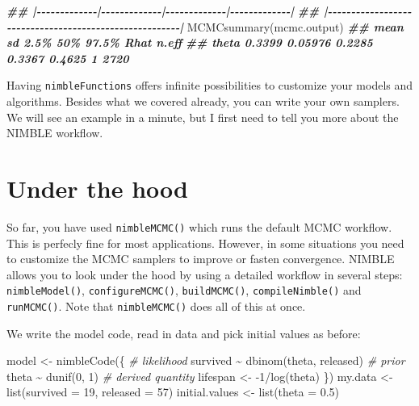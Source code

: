 \documentclass[
  12pt,
]{krantz}
\newenvironment{Shaded}{\begin{snugshade}}{\end{snugshade}}
\newcommand{\AttributeTok}[1]{\textcolor[rgb]{0.77,0.63,0.00}{#1}}
\newcommand{\CommentTok}[1]{\textcolor[rgb]{0.56,0.35,0.01}{\textit{#1}}}
\newcommand{\DecValTok}[1]{\textcolor[rgb]{0.00,0.00,0.81}{#1}}
\newcommand{\DocumentationTok}[1]{\textcolor[rgb]{0.56,0.35,0.01}{\textbf{\textit{#1}}}}
\newcommand{\FloatTok}[1]{\textcolor[rgb]{0.00,0.00,0.81}{#1}}
\newcommand{\FunctionTok}[1]{\textcolor[rgb]{0.00,0.00,0.00}{#1}}
\newcommand{\NormalTok}[1]{#1}
\newcommand{\OtherTok}[1]{\textcolor[rgb]{0.56,0.35,0.01}{#1}}
\newcommand{\SpecialCharTok}[1]{\textcolor[rgb]{0.00,0.00,0.00}{#1}}
\begin{document}
\begin{Shaded}
\begin{Highlighting}[]
\DocumentationTok{\#\# |{-}{-}{-}{-}{-}{-}{-}{-}{-}{-}{-}{-}{-}|{-}{-}{-}{-}{-}{-}{-}{-}{-}{-}{-}{-}{-}|{-}{-}{-}{-}{-}{-}{-}{-}{-}{-}{-}{-}{-}|{-}{-}{-}{-}{-}{-}{-}{-}{-}{-}{-}{-}{-}|}
\DocumentationTok{\#\# |{-}{-}{-}{-}{-}{-}{-}{-}{-}{-}{-}{-}{-}{-}{-}{-}{-}{-}{-}{-}{-}{-}{-}{-}{-}{-}{-}{-}{-}{-}{-}{-}{-}{-}{-}{-}{-}{-}{-}{-}{-}{-}{-}{-}{-}{-}{-}{-}{-}{-}{-}{-}{-}{-}{-}|}
\FunctionTok{MCMCsummary}\NormalTok{(mcmc.output)}
\DocumentationTok{\#\#         mean      sd   2.5\%    50\%  97.5\% Rhat n.eff}
\DocumentationTok{\#\# theta 0.3399 0.05976 0.2285 0.3367 0.4625    1  2720}
\end{Highlighting}
\end{Shaded}

Having \texttt{nimbleFunctions} offers infinite possibilities to customize your models and algorithms. Besides what we covered already, you can write your own samplers. We will see an example in a minute, but I first need to tell you more about the NIMBLE workflow.

\hypertarget{under-the-hood}{%
\section{Under the hood}\label{under-the-hood}}

So far, you have used \texttt{nimbleMCMC()} which runs the default MCMC workflow. This is perfecly fine for most applications. However, in some situations you need to customize the MCMC samplers to improve or fasten convergence. NIMBLE allows you to look under the hood by using a detailed workflow in several steps: \texttt{nimbleModel()}, \texttt{configureMCMC()}, \texttt{buildMCMC()}, \texttt{compileNimble()} and \texttt{runMCMC()}. Note that \texttt{nimbleMCMC()} does all of this at once.

We write the model code, read in data and pick initial values as before:

\begin{Shaded}
\begin{Highlighting}[]
\NormalTok{model }\OtherTok{\textless{}{-}} \FunctionTok{nimbleCode}\NormalTok{(\{}
  \CommentTok{\# likelihood}
\NormalTok{  survived }\SpecialCharTok{\textasciitilde{}} \FunctionTok{dbinom}\NormalTok{(theta, released)}
  \CommentTok{\# prior}
\NormalTok{  theta }\SpecialCharTok{\textasciitilde{}} \FunctionTok{dunif}\NormalTok{(}\DecValTok{0}\NormalTok{, }\DecValTok{1}\NormalTok{)}
  \CommentTok{\# derived quantity}
\NormalTok{  lifespan }\OtherTok{\textless{}{-}} \SpecialCharTok{{-}}\DecValTok{1}\SpecialCharTok{/}\FunctionTok{log}\NormalTok{(theta)}
\NormalTok{\})}
\NormalTok{my.data }\OtherTok{\textless{}{-}} \FunctionTok{list}\NormalTok{(}\AttributeTok{survived =} \DecValTok{19}\NormalTok{, }\AttributeTok{released =} \DecValTok{57}\NormalTok{)}
\NormalTok{initial.values }\OtherTok{\textless{}{-}} \FunctionTok{list}\NormalTok{(}\AttributeTok{theta =} \FloatTok{0.5}\NormalTok{)}
\end{Highlighting}
\end{Shaded}
\end{document}
